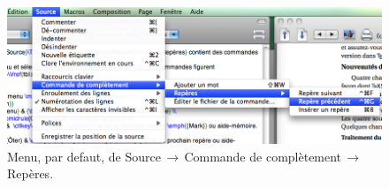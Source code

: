 \documentclass[11pt,french]{article}
\newcommand{\optkey}{\textsf{Opt}}
\newcommand{\ctlkey}{\textsf{Ctl}}
\newcommand{\cmdkey}{\textsf{Cmd}}
\newcommand{\mnu}[1]{\textsf{#1}}
\newcommand{\To}{\,\(\to\)\,}
\newcommand{\TS}{\textsf{\TeX Shop}}
\newcommand{\CCT}{\textsf{CommandCompletion.txt}}
\begin{document}

\begin{figure}[htbp]
\centering\includegraphics[width=\textwidth]{figs/mark}
\caption{Menu, par defaut, de \mnu{Source}\To\mnu{Commande de complètement}\To\mnu{Repères}.\label{fig:marks}}
\end{figure}
\end{document}
